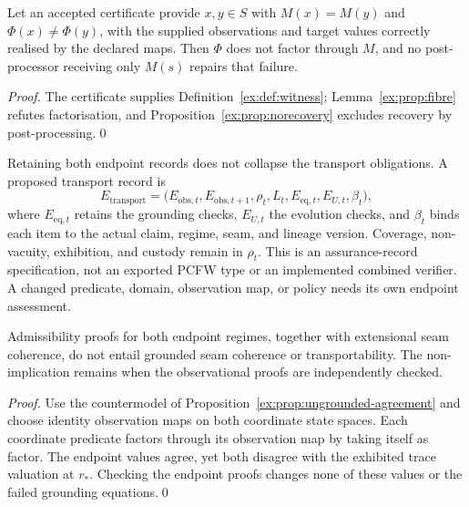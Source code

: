 \documentclass[smallextended,envcountsect,envcountsame,natbib]{svjour3}
\begin{document}
\begin{proposition}\label{ex:prop:pcfw-refutation}
Let an accepted certificate provide $x,y\in S$ with $M(x)=M(y)$ and $\Phi(x)\neq\Phi(y)$, with the supplied observations and target values correctly realised by the declared maps. Then $\Phi$ does not factor through $M$, and no post-processor receiving only $M(s)$ repairs that failure.
\end{proposition}
\begin{proof}
The certificate supplies Definition~\ref{ex:def:witness}; Lemma~\ref{ex:prop:fibre} refutes factorisation, and Proposition~\ref{ex:prop:norecovery} excludes recovery by post-processing.\qed
\end{proof}

Retaining both endpoint records does not collapse the transport obligations. A proposed transport record is
\begin{equation}\label{ex:eq:certificate-interface}
E_{\mathrm{transport}}=
\bigl(E_{\mathrm{obs},t},E_{\mathrm{obs},t+1},
\rho_t,L_t,E_{\mathrm{eq},t},E_{U,t},\beta_t\bigr),
\end{equation}
where $E_{\mathrm{eq},t}$ retains the grounding checks, $E_{U,t}$ the evolution checks, and $\beta_t$ binds each item to the actual claim, regime, seam, and lineage version. Coverage, non-vacuity, exhibition, and custody remain in $\rho_t$. This is an assurance-record specification, not an exported PCFW type or an implemented combined verifier. A changed predicate, domain, observation map, or policy needs its own endpoint assessment.

\begin{proposition}\label{ex:prop:observation-not-transport}
Admissibility proofs for both endpoint regimes, together with extensional seam coherence, do not entail grounded seam coherence or transportability. The non-implication remains when the observational proofs are independently checked.
\end{proposition}
\begin{proof}
Use the countermodel of Proposition~\ref{ex:prop:ungrounded-agreement} and choose identity observation maps on both coordinate state spaces. Each coordinate predicate factors through its observation map by taking itself as factor. The endpoint values agree, yet both disagree with the exhibited trace valuation at $r_*$. Checking the endpoint proofs changes none of these values or the failed grounding equations.\qed
\end{proof}
\end{document}
